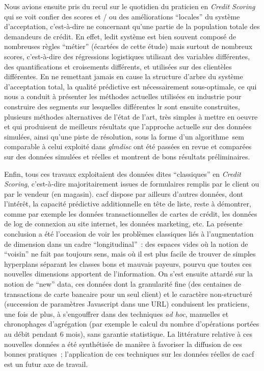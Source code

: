 Nous avions ensuite pris du recul sur le quotidien du praticien en \textit{Credit Scoring} qui se voit confier des scores et / ou des améliorations ``locales'' du système d'acceptation, c'est-à-dire ne concernant qu'une partie de la population totale des demandeurs de crédit. En effet, ledit système est bien souvent composé de nombreuses règles ``métier'' (écartées de cette étude) mais surtout de nombreux scores, c'est-à-dire des régressions logistiques utilisant des variables différentes, des quantifications et croisements différents, et utilisées sur des clientèles différentes. En ne remettant jamais en cause la structure d'arbre du système d'acceptation total, la qualité prédictive est nécessairement sous-optimale, ce qui nous a conduit à présenter les méthodes actuelles utilisées en industrie pour construire des segments sur lesquelles différentes \gls{lr} sont ensuite construites, plusieurs méthodes alternatives de l'état de l'art, très simples à mettre en oeuvre et qui produisent de meilleurs résultats que l'approche actuelle sur des données simulées, ainsi qu'une piste de résolution, sous la forme d'un algorithme~\gls{sem} comparable à celui exploité dans \textit{glmdisc} ont été passées en revue et comparées sur des données simulées et réelles et montrent de bons résultats préliminaires.

\medskip

Enfin, tous ces travaux exploitaient des données dites ``classiques'' en \textit{Credit Scoring}, c'est-à-dire majoritairement issues de formulaires remplis par le client ou par le vendeur (en magasin). \gls{cacf} dispose par ailleurs d'autres données, dont l'intérêt, la capacité prédictive additionnelle en tête de liste, reste à démontrer, comme par exemple les données transactionnelles de cartes de crédit, les données de log de connexion au site internet, les données marketing, etc. La présente conclusion a été l'occasion de voir les problèmes classiques liés à l'augmentation de dimension dans un cadre ``longitudinal''~: des espaces vides où la notion de ``voisin'' ne fait pas toujours sens, mais où il est plus facile de trouver de simples hyperplans séparant les classes bons et mauvais payeurs, pourvu que toutes ces nouvelles dimensions apportent de l'information. On s'est ensuite attardé sur la notion de ``new'' data, ces données dont la granularité fine (des centaines de transactions de carte bancaire pour un seul client) et le caractère non-structuré (succession de paramètres Javascript dans une URL) conduisent les praticiens, une fois de plus, à s'engouffrer dans des techniques \textit{ad hoc}, manuelles et chronophages d'agrégation (par exemple le calcul du nombre d'opérations portées au débit pendant 6 mois), sans garantie statistique. La littérature relative à ces nouvelles données a été synthétisée de manière à favoriser la diffusion de ces bonnes pratiques~; l'application de ces techniques sur les données réelles de \gls{cacf} est un futur axe de travail.

